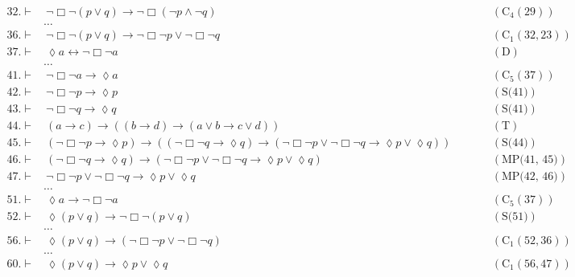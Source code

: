 \documentclass[a4paper, 12pt]{report}
\begin{document}
{{\begin{equation*}
\begin{alignedat}{2}
                    32. \vdash & \ \lnot \Box \lnot (p \lor q) \to \lnot \Box (\lnot p \land \lnot q) && \quad \quad (\mbox{C}_4(29)) \\
                               & \ldots && \\
                    36. \vdash & \ \lnot \Box \lnot (p \lor q) \to \lnot \Box \lnot p \lor \lnot \Box \lnot q && \quad \quad (\mbox{C}_1(32, 23)) \\
                    37. \vdash & \ \lozenge a \leftrightarrow \lnot \Box \lnot a && \quad \quad (\mbox{D}) \\
                               & \ldots && \\
                    41. \vdash & \ \lnot \Box \lnot a \to \lozenge a && \quad \quad (\mbox{C}_5(37)) \\
                    42. \vdash & \ \lnot \Box \lnot p \to \lozenge p && \quad \quad (\mbox{S(41)}) \\
                    43. \vdash & \ \lnot \Box \lnot q \to \lozenge q && \quad \quad (\mbox{S(41)}) \\
                    44. \vdash & \ (a \to c) \to ((b \to d) \to (a \lor b \to c \lor d)) && \quad \quad (\mbox{T}) \\
                    45. \vdash & \ (\lnot \Box \lnot p \to \lozenge p ) \to ((\lnot \Box \lnot q \to \lozenge q) \to (\lnot \Box \lnot p \lor \lnot \Box \lnot q \to \lozenge p \lor \lozenge q)) && \quad \quad (\mbox{S(44)}) \\
                    46. \vdash & \ (\lnot \Box \lnot q \to \lozenge q) \to (\lnot \Box \lnot p \lor \lnot \Box \lnot q \to \lozenge p \lor \lozenge q) && \quad \quad (\mbox{MP(41, 45)}) \\
                    47. \vdash & \ \lnot \Box \lnot p \lor \lnot \Box \lnot q \to \lozenge p \lor \lozenge q && \quad \quad (\mbox{MP(42, 46)}) \\
                               & \ldots && \\
                    51. \vdash & \ \lozenge a \to \lnot \Box \lnot a && \quad \quad (\mbox{C}_5(37)) \\
                    52. \vdash & \ \lozenge (p \lor q) \to \lnot \Box \lnot (p \lor q) && \quad \quad (\mbox{S(51)}) \\
                               & \ldots && \\
                    56. \vdash & \ \lozenge (p \lor q) \to (\lnot \Box \lnot p \lor \lnot \Box \lnot q) && \quad \quad (\mbox{C}_1(52, 36)) \\
                               & \ldots && \\
                    60. \vdash & \ \lozenge (p \lor q) \to \lozenge p \lor \lozenge q && \quad \quad (\mbox{C}_1(56, 47)) \\
                \end{alignedat}
            \end{equation*}
        }

}
\end{document}

